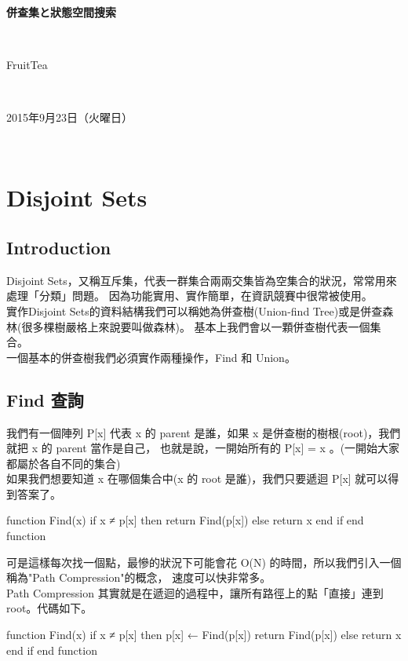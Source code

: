 \documentclass{article}
\title{\hmwkClass}
\author{\hmwkAuthorName}
\date{\hmwkDueDate}
\def\normalsize{\fontsize{12}{16}\selectfont}
\def\large{\fontsize{16}{24}\selectfont}
\def\LARGE{\fontsize{24}{36}\selectfont}
\newcommand{\hmwkDueDate}{2015年9月23日（火曜日）} %
\newcommand{\hmwkClass}{併查集と狀態空間搜索} %
\newcommand{\hmwkAuthorName}{FruitTea} %
\begin{document}
\LARGE~\\[4ex]
\centerline{\bf\hmwkClass}\large\\[2ex]\centerline{\hmwkAuthorName}\\[2ex]\centerline{\hmwkDueDate}\\
\normalsize

\section{Disjoint Sets}
\subsection*{Introduction}
Disjoint Sets，又稱互斥集，代表一群集合兩兩交集皆為空集合的狀況，常常用來處理「分類」問題。
因為功能實用、實作簡單，在資訊競賽中很常被使用。\\
實作Disjoint Sets的資料結構我們可以稱她為併查樹(Union-find Tree)或是併查森林(很多棵樹嚴格上來說要叫做森林)。
基本上我們會以一顆併查樹代表一個集合。\\
一個基本的併查樹我們必須實作兩種操作，Find 和 Union。

\subsection{Find 查詢}
我們有一個陣列 P[x] 代表 x 的 parent 是誰，如果 x 是併查樹的樹根(root)，我們就把 x 的 parent 當作是自己，
也就是說，一開始所有的 P[x] = x 。(一開始大家都屬於各自不同的集合)\\
如果我們想要知道 x 在哪個集合中(x 的 root 是誰)，我們只要遞迴 P[x] 就可以得到答案了。

\begin{algorithm}[caption={Find}, label={alg1}]
function Find(x)
    if x ≠ p[x] then
        return Find(p[x])
    else
        return x
    end if
end function
\end{algorithm}

可是這樣每次找一個點，最慘的狀況下可能會花 O(N) 的時間，所以我們引入一個稱為"Path Compression"的概念，
速度可以快非常多。\\
Path Compression 其實就是在遞迴的過程中，讓所有路徑上的點「直接」連到root。代碼如下。

\begin{algorithm}[caption={Find \& Path Compression}, label={alg1}]
function Find(x)
    if x ≠ p[x] then
        p[x] ← Find(p[x])
        return Find(p[x])
    else
        return x
    end if
end function
\end{algorithm}
\end{document}
